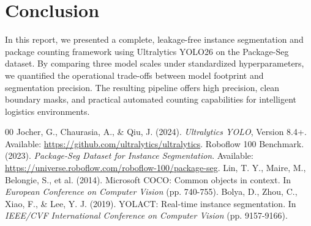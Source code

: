 \documentclass[conference]{IEEEtran}
\begin{document}
\section{Conclusion}
In this report, we presented a complete, leakage-free instance segmentation and package counting framework using Ultralytics YOLO26 on the Package-Seg dataset. By comparing three model scales under standardized hyperparameters, we quantified the operational trade-offs between model footprint and segmentation precision. The resulting pipeline offers high precision, clean boundary masks, and practical automated counting capabilities for intelligent logistics environments.

\begin{thebibliography}{00}
 Jocher, G., Chaurasia, A., \& Qiu, J. (2024). \textit{Ultralytics YOLO}, Version 8.4+. Available: \url{https://github.com/ultralytics/ultralytics}.
 Roboflow 100 Benchmark. (2023). \textit{Package-Seg Dataset for Instance Segmentation}. Available: \url{https://universe.roboflow.com/roboflow-100/package-seg}.
 Lin, T. Y., Maire, M., Belongie, S., et al. (2014). Microsoft COCO: Common objects in context. In \textit{European Conference on Computer Vision} (pp. 740-755).
 Bolya, D., Zhou, C., Xiao, F., \& Lee, Y. J. (2019). YOLACT: Real-time instance segmentation. In \textit{IEEE/CVF International Conference on Computer Vision} (pp. 9157-9166).
\end{thebibliography}
\end{document}
